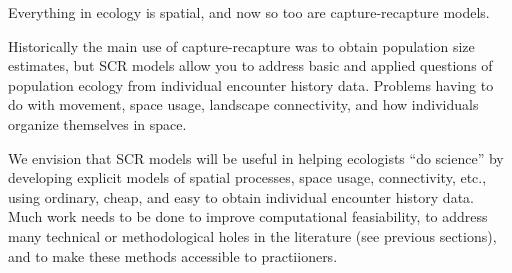 Everything in ecology is spatial, and now so too are capture-recapture
models.

Historically the main use of capture-recapture was to obtain population
size estimates, but
SCR models allow you to address basic and applied questions of
population ecology from individual encounter history data. Problems
having to do with movement, space usage, landscape connectivity, and
how individuals organize themselves in space.

We envision that SCR models will be useful in helping
ecologists ``do science'' by developing explicit models of spatial
processes, space usage, connectivity, etc., using ordinary, cheap, and
easy to obtain individual encounter history data. Much work needs to
be done to improve computational feasiability, to address many
technical or methodological holes in the literature (see previous
sections), and to make these methods accessible to practiioners.











